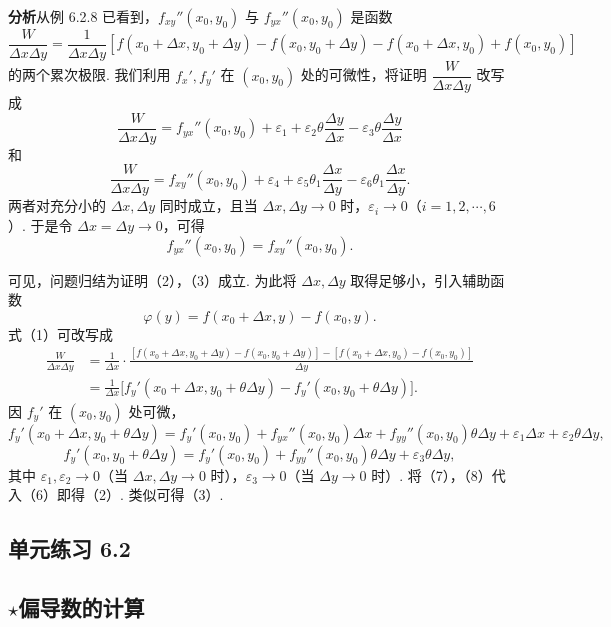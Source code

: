 \documentclass[UTF8, 12pt, fontset=fandol, oneside]{ctexart}
\begin{document}
\noindent\textbf{分析}\quad 从例 6.2.8 已看到，$f_{xy}''(x_0,y_0)$ 与 $f_{yx}''(x_0,y_0)$ 是函数
\[
  \frac{W}{\Delta x\Delta y}
  =\frac1{\Delta x\Delta y}[f(x_0+\Delta x,y_0+\Delta y)-f(x_0,y_0+\Delta y)-f(x_0+\Delta x,y_0)+f(x_0,y_0)] \tag{1}
\]
的两个累次极限. 我们利用 $f_x',f_y'$ 在 $(x_0,y_0)$ 处的可微性，将证明 $\dfrac{W}{\Delta x\Delta y}$ 改写成
\[
  \frac{W}{\Delta x\Delta y}=f_{yx}''(x_0,y_0)+\varepsilon_1+\varepsilon_2\theta\frac{\Delta y}{\Delta x}-\varepsilon_3\theta\frac{\Delta y}{\Delta x} \tag{2}
\]
和
\[
  \frac{W}{\Delta x\Delta y}=f_{xy}''(x_0,y_0)+\varepsilon_4+\varepsilon_5\theta_1\frac{\Delta x}{\Delta y}-\varepsilon_6\theta_1\frac{\Delta x}{\Delta y}. \tag{3}
\]
两者对充分小的 $\Delta x,\Delta y$ 同时成立，且当 $\Delta x,\Delta y\to0$ 时，$\varepsilon_i\to0$（$i=1,2,\cdots,6$）. 于是令 $\Delta x=\Delta y\to0$，可得
\[
  f_{yx}''(x_0,y_0)=f_{xy}''(x_0,y_0). \tag{4}
\]

可见，问题归结为证明（2），（3）成立. 为此将 $\Delta x,\Delta y$ 取得足够小，引入辅助函数
\[
  \varphi(y)=f(x_0+\Delta x,y)-f(x_0,y). \tag{5}
\]
式（1）可改写成
\begin{equation}
\begin{aligned}
\frac{W}{\Delta x\Delta y}
&=\frac1{\Delta x}\cdot
\frac{[f(x_0+\Delta x,y_0+\Delta y)-f(x_0,y_0+\Delta y)]
-[f(x_0+\Delta x,y_0)-f(x_0,y_0)]}{\Delta y}\\
&=\frac1{\Delta x}\bigl[f_y'(x_0+\Delta x,y_0+\theta\Delta y)
-f_y'(x_0,y_0+\theta\Delta y)\bigr].
\end{aligned}
\tag{6}
\end{equation}
因 $f_y'$ 在 $(x_0,y_0)$ 处可微，
\[
  f_y'(x_0+\Delta x,y_0+\theta\Delta y)
  =f_y'(x_0,y_0)+f_{yx}''(x_0,y_0)\Delta x
  +f_{yy}''(x_0,y_0)\theta\Delta y+\varepsilon_1\Delta x+\varepsilon_2\theta\Delta y, \tag{7}
\]
\[
  f_y'(x_0,y_0+\theta\Delta y)
  =f_y'(x_0,y_0)+f_{yy}''(x_0,y_0)\theta\Delta y+\varepsilon_3\theta\Delta y, \tag{8}
\]
其中 $\varepsilon_1,\varepsilon_2\to0$（当 $\Delta x,\Delta y\to0$ 时），$\varepsilon_3\to0$（当 $\Delta y\to0$ 时）. 将（7），（8）代入（6）即得（2）. 类似可得（3）.

\subsection*{单元练习 6.2}

\subsection*{\ensuremath{\star}偏导数的计算}
\end{document}
